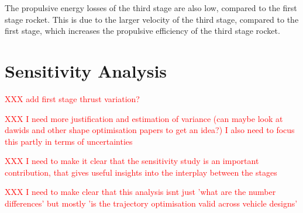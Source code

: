  The propulsive energy losses of the third stage are also low, compared to the first stage rocket. This is due to the larger velocity of the third stage, compared to the first stage, which increases the propulsive efficiency of the third stage rocket.
 


 

  

\section{Sensitivity Analysis}\label{sec:sensitivityNoReturn}
\textcolor{red}{XXX add first stage thrust variation?}

\textcolor{red}{XXX I need more justification and estimation of variance (can maybe look at dawids and other shape optimisation papers to get an idea?) I also need to focus this partly in terms of uncertainties}

\textcolor{red}{XXX I need to make it clear that the sensitivity study is an important contribution, that gives useful insights into the interplay between the stages}

\textcolor{red}{XXX I need to make clear that this analysis isnt just 'what are the number differences' but mostly 'is the trajectory optimisation valid across vehicle designs'}

